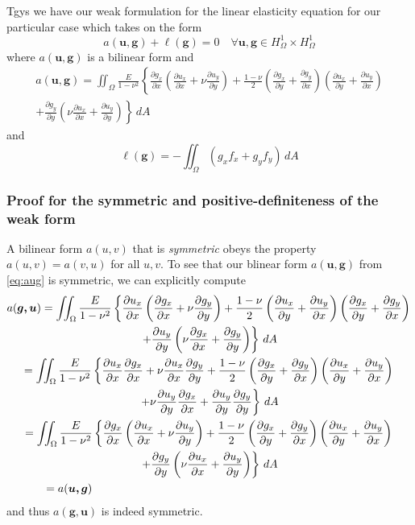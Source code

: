 \documentclass[11pt]{article}
\newcommand\p[2]{\frac{\partial #1}{\partial #2}}
\begin{document}
Tgys we have our weak formulation for the linear elasticity equation for our particular case which takes on the form
\begin{equation} \label{eq:weakForm}
  a(\bm{u,g}) + \ell(\bm{g}) = 0 \quad \forall \bm{u,g} \in H^1_\Omega \times H^1_\Omega
\end{equation}
where $a(\bm{u,g})$ is a bilinear form and
\begin{multline} \label{eq:aug}
  a(\bm{u,g}) =
  \iint_\Omega \frac{E}{1-\nu^2} \left\{
    \p{g_x}{x} \left( \p{u_x}{x} + \nu\p{u_y}{y} \right)
    + \frac{1-\nu}{2} \left( \p{g_x}{y} + \p{g_y}{x} \right)
      \left( \p{u_x}{y} + \p{u_y}{x} \right) \right. \\ \left.
    + \p{g_y}{y} \left(\nu\p{u_x}{x} + \p{u_y}{y} \right)
  \right\} \, dA
\end{multline}
and
\begin{equation} \label{eq:lg}
  \ell(\bm{g}) = - \iint_\Omega \left( g_x f_x + g_y f_y \right) \, dA
\end{equation}

\subsubsection*{Proof for the symmetric and positive-definiteness of the weak form}
A bilinear form $a(u,v)$ that is \emph{symmetric} obeys the property $a(u,v) = a(v,u)$ for all $u,v$. To see that our blinear form $a(\bm{u,g})$ from \eqref{eq:aug} is symmetric, we can explicitly compute
\begin{multline}
  a(\bm{g,u}) =
  \iint_\Omega \frac{E}{1-\nu^2} \left\{
    \p{u_x}{x} \left( \p{g_x}{x} + \nu\p{g_y}{y} \right)
      + \frac{1-\nu}{2} \left( \p{u_x}{y} + \p{u_y}{x} \right)
      \left( \p{g_x}{y} + \p{g_y}{x} \right) \right. \\ \left.
    + \p{u_y}{y} \left(\nu\p{g_x}{x} + \p{g_y}{y} \right)
  \right\} \, dA \\
  = \iint_\Omega \frac{E}{1-\nu^2} \left\{
  \p{u_x}{x} \p{g_x}{x} + \nu \p{u_x}{x} \p{g_y}{y}
  + \frac{1-\nu}{2} \left( \p{g_x}{y} + \p{g_y}{x} \right)
  \left( \p{u_x}{y} + \p{u_y}{x} \right) \right. \\ \left.
  + \nu\p{u_y}{y}\p{g_x}{x} + \p{u_y}{y}\p{g_y}{y}
  \right\} \, dA \\
  =   \iint_\Omega \frac{E}{1-\nu^2} \left\{
  \p{g_x}{x} \left( \p{u_x}{x} + \nu\p{u_y}{y} \right)
  + \frac{1-\nu}{2} \left( \p{g_x}{y} + \p{g_y}{x} \right)
  \left( \p{u_x}{y} + \p{u_y}{x} \right) \right. \\ \left.
  + \p{g_y}{y} \left(\nu\p{u_x}{x} + \p{u_y}{y} \right)
  \right\} \, dA \\
  \hspace{3.5em} = a(\bm{u,g}) \hfill
\end{multline}
and thus $a(\bm{g,u})$ is indeed symmetric.
\end{document}
